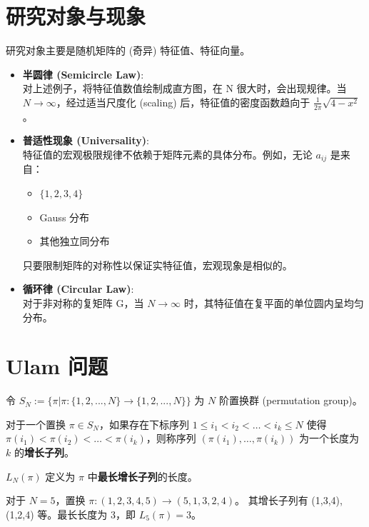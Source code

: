 \section{研究对象与现象}
研究对象主要是随机矩阵的 (奇异) 特征值、特征向量。
\begin{itemize}
    \item \textbf{半圆律 (Semicircle Law)}: \\
    对上述例子，将特征值数值绘制成直方图，在 N 很大时，会出现规律。当 $N \to \infty$，经过适当尺度化 (scaling) 后，特征值的密度函数趋向于 $\frac{1}{2\pi}\sqrt{4-x^2}$。

    \item \textbf{普适性现象 (Universality)}: \\
    特征值的宏观极限规律不依赖于矩阵元素的具体分布。例如，无论 $a_{ij}$ 是来自：
    \begin{itemize}
        \item $\{1,2,3,4\}$
        \item Gauss 分布
        \item 其他独立同分布
    \end{itemize}
    只要限制矩阵的对称性以保证实特征值，宏观现象是相似的。

    \item \textbf{循环律 (Circular Law)}: \\
    对于非对称的复矩阵 G，当 $N \to \infty$ 时，其特征值在复平面的单位圆内呈均匀分布。
\end{itemize}

\section{Ulam 问题}
\begin{definition}
令 $S_N := \{ \pi | \pi: \{1,2,...,N\} \to \{1,2,...,N\} \}$ 为 $N$ 阶置换群 (permutation group)。

对于一个置换 $\pi \in S_N$，如果存在下标序列 $1 \le i_1 < i_2 < \dots < i_k \le N$ 使得 $\pi(i_1) < \pi(i_2) < \dots < \pi(i_k)$，则称序列 $(\pi(i_1), \dots, \pi(i_k))$ 为一个长度为 $k$ 的\textbf{增长子列}。

$L_N(\pi)$ 定义为 $\pi$ 中\textbf{最长增长子列}的长度。
\end{definition}

\begin{example}
对于 $N=5$，置换 $\pi: (1,2,3,4,5) \to (5,1,3,2,4)$。
其增长子列有 (1,3,4), (1,2,4) 等。最长长度为 3，即 $L_5(\pi) = 3$。
\end{example}

